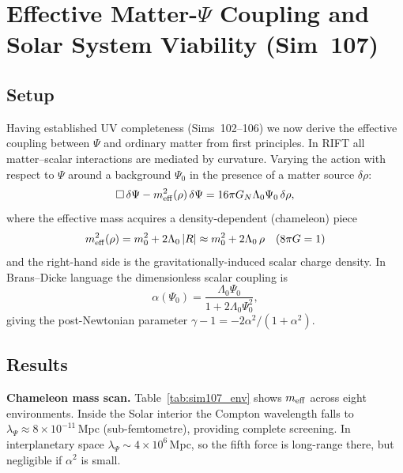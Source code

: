 \documentclass[12pt,a4paper]{article}
\begin{document}
\section{Effective Matter-$\Psi$ Coupling and Solar System Viability (Sim~107)}
\label{sec:sim107}

\subsection{Setup}

Having established UV completeness (Sims~102--106) we now derive the
effective coupling between $\Psi$ and ordinary matter from first principles.
In RIFT all matter--scalar interactions are mediated by curvature.  Varying
the action with respect to $\Psi$ around a background $\Psi_0$ in the
presence of a matter source $\delta\rho$:
\begin{equation}
  \Box\,\delta\Psi - m_{\rm eff}^2(\rho)\,\delta\Psi
  = 16\pi G_N \Lambda_0 \Psi_0\,\delta\rho ,
  \label{eq:dPsi}
\end{equation}
where the effective mass acquires a density-dependent (chameleon) piece
\begin{equation}
  m_{\rm eff}^2(\rho) = m_0^2 + 2\Lambda_0\,|R| \approx m_0^2 + 2\Lambda_0\,\rho
  \quad (8\pi G=1)
\end{equation}
and the right-hand side is the gravitationally-induced scalar charge density.
In Brans--Dicke language the dimensionless scalar coupling is
\begin{equation}
  \alpha(\Psi_0) = \frac{\Lambda_0\Psi_0}{1 + 2\Lambda_0\Psi_0^2} ,
\end{equation}
giving the post-Newtonian parameter $\gamma-1 = -2\alpha^2/(1+\alpha^2)$.

\subsection{Results}

\textbf{Chameleon mass scan.}
Table~\ref{tab:sim107_env} shows $m_{\rm eff}$ across eight environments.
Inside the Solar interior the Compton wavelength falls to
$\lambda_\Psi \approx 8\times10^{-11}$\,Mpc (sub-femtometre), providing
complete screening.  In interplanetary space $\lambda_\Psi \sim 4\times10^6$\,Mpc,
so the fifth force is long-range there, but negligible if $\alpha^2$ is small.
\end{document}
